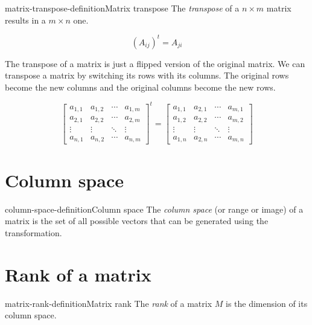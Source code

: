 \documentclass[preview]{standalone}
\begin{document}
\begin{snippetdefinition}{matrix-transpose-definition}{Matrix transpose}
    The \textit{transpose} of a \(n \times m\) matrix results in a \(m \times n\) one.

    \[
        {\left(A_{ij}\right)}^t=A_{ji}
    \]
    
    The transpose of a matrix is just a flipped version of the original matrix.
    We can transpose a matrix by switching its rows with its columns.
    The original rows become the new columns and the original columns become the new rows.
    
    \[
        {\begin{bmatrix} 
            a_{1,1} & a_{1,2} & \cdots & a_{1,m} \\
            a_{2,1} & a_{2,2} & \cdots & a_{2,m} \\
            \vdots  & \vdots  & \ddots & \vdots  \\
            a_{n,1} & a_{n,2} & \cdots & a_{n,m} 
        \end{bmatrix}}^t
        =
        \begin{bmatrix} 
            a_{1,1} & a_{2,1} & \cdots & a_{m,1} \\
            a_{1,2} & a_{2,2} & \cdots & a_{m,2} \\
            \vdots  & \vdots  & \ddots & \vdots  \\
            a_{1,n} & a_{2,n} & \cdots & a_{m,n} 
        \end{bmatrix}
    \]
\end{snippetdefinition}

\section{Column space}

\begin{snippetdefinition}{column-space-definition}{Column space}
    The \textit{column space} (or range or image) of a matrix is the
    set of all possible vectors that can be generated using the transformation.
\end{snippetdefinition}

\section{Rank of a matrix}

\begin{snippetdefinition}{matrix-rank-definition}{Matrix rank}
    The \textit{rank} of a matrix \(M\) is the dimension of its column space.
\end{snippetdefinition}
\end{document}
